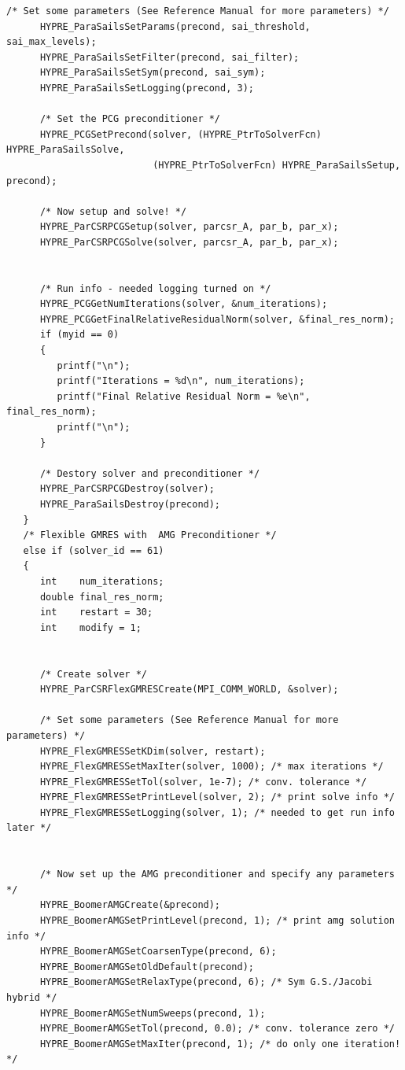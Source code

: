 \documentclass[a4paper,10pt]{article}
\numberwithin{figure}{section}
\numberwithin{table}{section}
\begin{document}
\begin{lstlisting}[frame=single, breaklines=true]
      /* Set some parameters (See Reference Manual for more parameters) */
      HYPRE_ParaSailsSetParams(precond, sai_threshold, sai_max_levels);
      HYPRE_ParaSailsSetFilter(precond, sai_filter);
      HYPRE_ParaSailsSetSym(precond, sai_sym);
      HYPRE_ParaSailsSetLogging(precond, 3);

      /* Set the PCG preconditioner */
      HYPRE_PCGSetPrecond(solver, (HYPRE_PtrToSolverFcn) HYPRE_ParaSailsSolve,
                          (HYPRE_PtrToSolverFcn) HYPRE_ParaSailsSetup, precond);

      /* Now setup and solve! */
      HYPRE_ParCSRPCGSetup(solver, parcsr_A, par_b, par_x);
      HYPRE_ParCSRPCGSolve(solver, parcsr_A, par_b, par_x);


      /* Run info - needed logging turned on */
      HYPRE_PCGGetNumIterations(solver, &num_iterations);
      HYPRE_PCGGetFinalRelativeResidualNorm(solver, &final_res_norm);
      if (myid == 0)
      {
         printf("\n");
         printf("Iterations = %d\n", num_iterations);
         printf("Final Relative Residual Norm = %e\n", final_res_norm);
         printf("\n");
      }

      /* Destory solver and preconditioner */
      HYPRE_ParCSRPCGDestroy(solver);
      HYPRE_ParaSailsDestroy(precond);
   }
   /* Flexible GMRES with  AMG Preconditioner */
   else if (solver_id == 61)
   {
      int    num_iterations;
      double final_res_norm;
      int    restart = 30;
      int    modify = 1;


      /* Create solver */
      HYPRE_ParCSRFlexGMRESCreate(MPI_COMM_WORLD, &solver);

      /* Set some parameters (See Reference Manual for more parameters) */
      HYPRE_FlexGMRESSetKDim(solver, restart);
      HYPRE_FlexGMRESSetMaxIter(solver, 1000); /* max iterations */
      HYPRE_FlexGMRESSetTol(solver, 1e-7); /* conv. tolerance */
      HYPRE_FlexGMRESSetPrintLevel(solver, 2); /* print solve info */
      HYPRE_FlexGMRESSetLogging(solver, 1); /* needed to get run info later */


      /* Now set up the AMG preconditioner and specify any parameters */
      HYPRE_BoomerAMGCreate(&precond);
      HYPRE_BoomerAMGSetPrintLevel(precond, 1); /* print amg solution info */
      HYPRE_BoomerAMGSetCoarsenType(precond, 6);
      HYPRE_BoomerAMGSetOldDefault(precond);
      HYPRE_BoomerAMGSetRelaxType(precond, 6); /* Sym G.S./Jacobi hybrid */
      HYPRE_BoomerAMGSetNumSweeps(precond, 1);
      HYPRE_BoomerAMGSetTol(precond, 0.0); /* conv. tolerance zero */
      HYPRE_BoomerAMGSetMaxIter(precond, 1); /* do only one iteration! */


\end{lstlisting}
\end{document}

